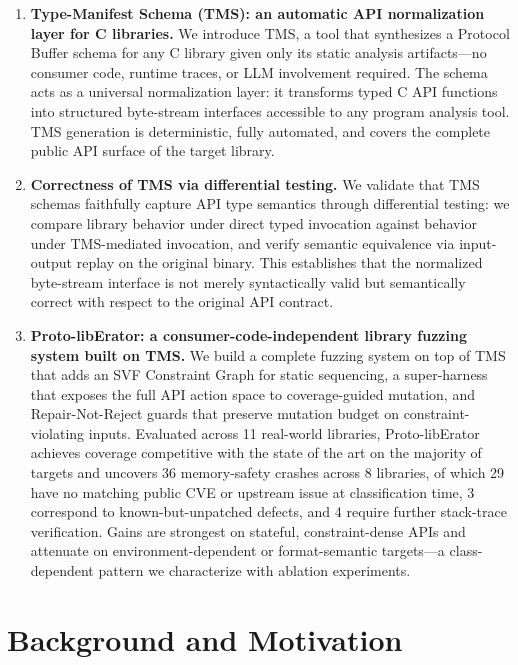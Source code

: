\documentclass[sigconf,anonymous]{acmart}
\begin{document}
\begin{enumerate}

\item \textbf{Type-Manifest Schema (TMS): an automatic API normalization
  layer for C libraries.}
  We introduce TMS, a tool that synthesizes a Protocol Buffer schema
  for any C library given only its static analysis artifacts---no
  consumer code, runtime traces, or LLM involvement required.  The
  schema acts as a universal normalization layer: it transforms typed C
  API functions into structured byte-stream interfaces accessible to any
  program analysis tool.  TMS generation is deterministic, fully
  automated, and covers the complete public API surface of the target
  library.

\item \textbf{Correctness of TMS via differential testing.}
  We validate that TMS schemas faithfully capture API type semantics
  through differential testing: we compare library behavior under direct
  typed invocation against behavior under TMS-mediated invocation, and
  verify semantic equivalence via input-output replay on the original
  binary.  This establishes that the normalized byte-stream interface is
  not merely syntactically valid but semantically correct with respect
  to the original API contract.

\item \textbf{Proto-libErator: a consumer-code-independent library
  fuzzing system built on TMS.}
  We build a complete fuzzing system on top of TMS that adds an SVF
  Constraint Graph for static sequencing, a super-harness that exposes
  the full API action space to coverage-guided mutation, and
  Repair-Not-Reject guards that preserve mutation budget on
  constraint-violating inputs.  Evaluated across 11 real-world
  libraries, Proto-libErator achieves coverage competitive with the
  state of the art on the majority of targets and uncovers 36
  memory-safety crashes across 8 libraries, of which 29 have no
  matching public CVE or upstream issue at classification time, 3
  correspond to known-but-unpatched defects, and 4 require further
  stack-trace verification.  Gains are strongest on stateful,
  constraint-dense APIs and attenuate on environment-dependent or
  format-semantic targets---a class-dependent pattern we characterize
  with ablation experiments.

\end{enumerate}

\section{Background and Motivation}
\label{sec:background}
\end{document}
